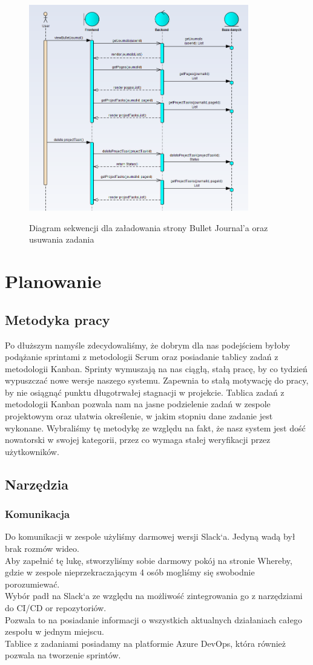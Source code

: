 \documentclass[a4paper,11pt]{report}
\begin{document}
\begin{figure}[h]
	\centering
	\includegraphics[width=\textwidth, height=9cm]{sekwencji1}\\
	\caption{Diagram sekwencji dla załadowania strony Bullet Journal’a oraz usuwania zadania}
	\label{fig:seq2}
\end{figure}
\chapter {Planowanie}
\section{Metodyka pracy}
Po dłuższym namyśle zdecydowaliśmy, że dobrym dla nas podejściem byłoby podążanie sprintami z metodologii Scrum
 oraz posiadanie tablicy zadań z metodologii Kanban\cite{agile}.
 Sprinty wymuszają na nas ciągłą, stałą pracę, by co tydzień wypuszczać nowe wersje naszego systemu.
 Zapewnia to stałą motywację do pracy, by nie osiągnąć punktu długotrwałej stagnacji w projekcie.
 Tablica zadań z metodologii Kanban pozwala nam na jasne podzielenie zadań w zespole projektowym
 oraz ułatwia określenie, w jakim stopniu dane zadanie jest wykonane.
 Wybraliśmy tę metodykę ze względu na fakt, że nasz system jest dość nowatorski w swojej kategorii,
 przez co wymaga stałej weryfikacji przez użytkowników.
\section{Narzędzia}
\subsection {Komunikacja}
Do komunikacji w zespole użyliśmy darmowej wersji Slack`a. Jedyną wadą był brak rozmów wideo.\\
Aby zapełnić tę lukę, stworzyliśmy sobie darmowy pokój na stronie Whereby, gdzie w zespole nieprzekraczającym 4
osób mogliśmy się swobodnie porozumiewać.\\
Wybór padł na Slack`a ze względu na możliwość zintegrowania go z narzędziami do CI/CD or repozytoriów.\\
Pozwala to na posiadanie informacji o wszystkich aktualnych działaniach całego zespołu w jednym miejscu.\\
Tablice z zadaniami posiadamy na platformie Azure DevOps, która również pozwala na tworzenie sprintów.\\
\end{document}
